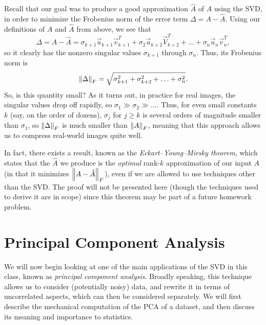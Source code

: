 \documentclass[letterpaper]{article}
\theoremstyle{remark}
\begin{document}
Recall that our goal was to produce a good approximation $\hat{A}$ of $A$ using the SVD, in order to minimize the Frobenius norm of the error term $\Delta = A - \hat{A}$. Using our definitions of $A$ and $\hat{A}$ from above, we see that
\[
    \Delta = A - \hat{A} = \sigma_{k+1} \vec{u}_{k+1}\vec{v}_{k+1}^T + \sigma_2 \vec{u}_{k+2}\vec{V}_{k+2}^T + \ldots + \sigma_n \vec{u}_n\vec{v}_n^T,
\]
so it clearly has the nonzero singular values $\sigma_{k+1}$ through $\sigma_n$. Thus, its Frobenius norm is
\[
    \norm{\Delta}_F = \sqrt{\sigma_{k+1}^2 + \sigma_{k+2}^2 + \ldots + \sigma_n^2}.
\]
So, is this quantity small? As it turns out, in practice for real images, the singular values drop off rapidly, so $\sigma_1 \gg \sigma_2 \gg \ldots$. Thus, for even small constants $k$ (say, on the order of dozens), $\sigma_{j}$ for $j \ge k$ is several orders of magnitude smaller than $\sigma_1$, so $\norm{\Delta}_F$ is much smaller than $\norm{A}_F$, meaning that this approach allows us to compress real-world images quite well.

In fact, there exists a result, known as the \emph{Eckart–Young–Mirsky theorem}, which states that the $\hat{A}$ we produce is the \emph{optimal} rank-$k$ approximation of our input $A$ (in that it minimizes $\norm{A - \hat{A}}_F$), even if we are allowed to use techniques other than the SVD. The proof will not be presented here (though the techniques used to derive it are in scope) since this theorem may be part of a future homework problem.

\section{Principal Component Analysis}
We will now begin looking at one of the main applications of the SVD in this class, known as \emph{principal component analysis}. Broadly speaking, this technique allows us to consider (potentially noisy) data, and rewrite it in terms of uncorrelated aspects, which can then be considered separately. We will first describe the mechanical computation of the PCA of a dataset, and then discuss its meaning and importance to statistics.
\end{document}
